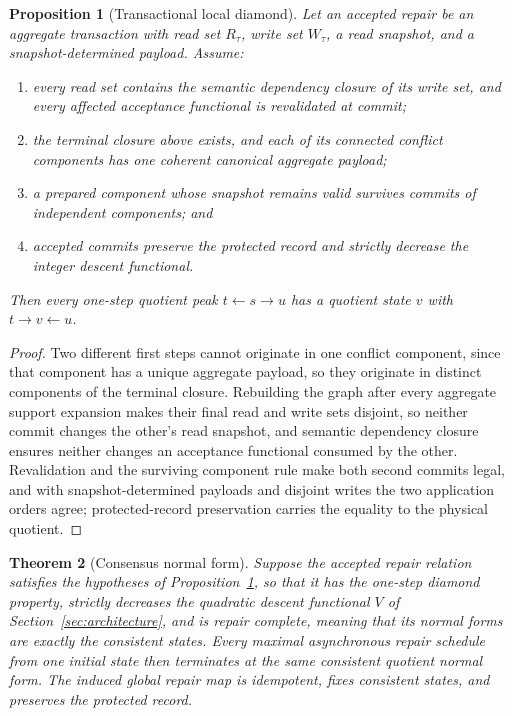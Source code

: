 \documentclass[11pt]{article}
\newtheorem{theorem}{Theorem}[section]
\newtheorem{proposition}[theorem]{Proposition}
\theoremstyle{definition}
\theoremstyle{remark}
\begin{document}
\begin{proposition}[Transactional local diamond]
\label{prop:transactional-diamond}
Let an accepted repair be an aggregate transaction with read set $R_\tau$,
write set $W_\tau$, a read snapshot, and a snapshot-determined payload.
Assume:
\begin{enumerate}[label=(\roman*),leftmargin=1.6em]
\item every read set contains the semantic dependency closure of its write
set, and every affected acceptance functional is revalidated at commit;
\item the terminal closure above exists, and each of its connected conflict
components has one coherent canonical aggregate payload;
\item a prepared component whose snapshot remains valid survives commits of
independent components; and
\item accepted commits preserve the protected record and strictly decrease
the integer descent functional.
\end{enumerate}
Then every one-step quotient peak $t\longleftarrow s\longrightarrow u$ has a
quotient state $v$ with $t\longrightarrow v\longleftarrow u$.
\end{proposition}

\begin{proof}
Two different first steps cannot originate in one conflict component, since
that component has a unique aggregate payload, so they originate in distinct
components of the terminal closure. Rebuilding the graph after every
aggregate support expansion makes their final read and write sets disjoint,
so neither commit changes the other's read snapshot, and semantic dependency
closure ensures neither changes an acceptance functional consumed by the
other. Revalidation and the surviving component rule make both second
commits legal, and with snapshot-determined payloads and disjoint writes the
two application orders agree; protected-record preservation carries the
equality to the physical quotient.
\end{proof}

\begin{theorem}[Consensus normal form]
\label{thm:confluence}
Suppose the accepted repair relation satisfies the hypotheses of Proposition~\ref{prop:transactional-diamond}, so that it has the one-step diamond property, strictly decreases the quadratic descent functional $V$ of Section~\ref{sec:architecture}, and is repair complete, meaning that its normal forms are exactly the consistent states. Every maximal asynchronous
repair schedule from one initial state then terminates at the same consistent
quotient normal form. The induced global repair map is idempotent, fixes
consistent states, and preserves the protected record.
\end{theorem}
\end{document}
